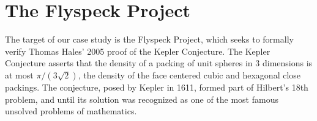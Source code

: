 \section{The Flyspeck Project}
\label{sec:flyspeck}

\begin{figure}
  \centering
  \vspace{-.95cm}
  \vspace{-1.4cm}
\end{figure}


The target of our case study is the Flyspeck Project, which seeks to
formally verify Thomas Hales' 2005 proof of the Kepler Conjecture.
The Kepler Conjecture asserts that the density of a packing of unit
spheres in 3 dimensions is at most $\pi/(3\sqrt{2})$, the density of the face centered
cubic and hexagonal close packings.  The conjecture, posed by Kepler
in 1611, formed part of Hilbert's 18th problem, and until its solution
was recognized as one of the most famous unsolved problems of
mathematics.

